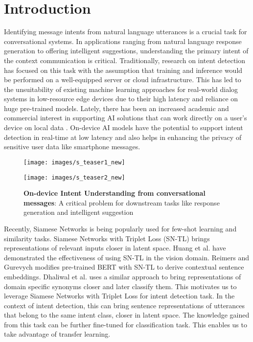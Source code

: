 \documentclass[conference]{IEEEtran}
\begin{document}
\section{Introduction}\label{sec:introduction}

Identifying message intents from natural language utterances is a crucial task for conversational systems. In applications ranging from natural language response generation to offering intelligent suggestions, understanding the primary intent of the context communication is critical. Traditionally, research on intent detection has focused on this task with the assumption that training and inference would be performed on a well-equipped server or cloud infrastructure. This has led to the unsuitability of existing machine learning approaches for real-world dialog systems in low-resource edge devices due to their high latency and reliance on huge pre-trained models. Lately, there has been an increased academic and commercial interest in supporting AI solutions that can work directly on a user's device on local data \cite{9364648, agarwal-etal-2020-emplite}. On-device AI models have the potential to support intent detection in real-time at low latency and also helps in enhancing the privacy of sensitive user data like smartphone messages.

\begin{figure}[t]
	\centering
	\begin{minipage}[t]{0.58\linewidth}
		\texttt{[image: images/s\_teaser1\_new]}
		\label{fig:teaserPhone}
	\end{minipage}
	\begin{minipage}[t]{0.35\linewidth}
		\texttt{[image: images/s\_teaser2\_new]}
		\label{fig:teaserWatch}
	\end{minipage}
	\caption{\textbf{On-device Intent Understanding from conversational messages}: {\normalfont A critical problem for downstream tasks like response generation and intelligent suggestion}}
	\label{fig:teaser}
\end{figure}

Recently, Siamese Networks is being popularly used for few-shot learning and similarity tasks. Siamese Networks with Triplet Loss (SN-TL) brings representations of relevant inputs closer in latent space. Huang et al. \cite{Huang_2017} have demonstrated the effectiveness of using SN-TL in the vision domain. Reimers and Gurevych \cite{reimers-gurevych-2019-sentence} modifies pre-trained BERT with SN-TL to derive contextual sentence embeddings. Dhaliwal et al. \cite{9364403} uses a similar approach to bring representations of domain specific synonyms closer and later classify them. This motivates us to leverage Siamese Networks with Triplet Loss for intent detection task. In the context of intent detection, this can bring sentence representations of utterances that belong to the same intent class, closer in latent space. The knowledge gained from this task can be further fine-tuned for classification task. This enables us to take advantage of transfer learning.
\end{document}
